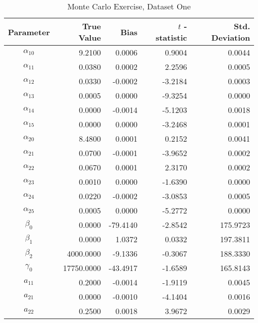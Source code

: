 \begin{table}\onehalfspacing
\begin{center}
\begin{threeparttable}
  \caption{Monte Carlo Exercise, Dataset One}
  \label{Monte Carlo: One}
  \begin{tabular}{crrrr}\toprule

  Parameter & True Value & Bias & $t$ - statistic & Std. Deviation \\
  \midrule
  $\alpha_{10}$ &     \phantom{20000}9.2100 &    \phantom{-17}0.0006 &     0.9004 &       0.0044 \\
  $\alpha_{11}$ &     0.0380 &    0.0002 &     2.2596 &       0.0005 \\
  $\alpha_{12}$ &     0.0330 &   -0.0002 &    -3.2184 &       0.0003 \\
  $\alpha_{13}$ &     0.0005 &    0.0000 &    -9.3254 &       0.0000 \\
  $\alpha_{14}$ &     0.0000 &   -0.0014 &    -5.1203 &       0.0018 \\
  $\alpha_{15}$ &     0.0000 &    0.0000 &    -3.2468 &       0.0001 \\
  $\alpha_{20}$ &     8.4800 &    0.0001 &     0.2152 &       0.0041 \\
  $\alpha_{21}$ &     0.0700 &   -0.0001 &    -3.9652 &       0.0002 \\
  $\alpha_{22}$ &     0.0670 &    0.0001 &     2.3170 &       0.0002 \\
  $\alpha_{23}$ &     0.0010 &    0.0000 &    -1.6390 &       0.0000 \\
  $\alpha_{24}$ &     0.0220 &   -0.0002 &    -3.0853 &       0.0005 \\
  $\alpha_{25}$ &     0.0005 &    0.0000 &    -5.2772 &       0.0000 \\
  $\beta_{0}$   &     0.0000 &  -79.4140 &    -2.8542 &     175.9723 \\
  $\beta_{1}$   &     0.0000 &    1.0372 &     0.0332 &     197.3811 \\
  $\beta_{2}$   &  4000.0000 &   -9.1336 &    -0.3067 &     188.3330 \\
  $\gamma_{0}$  & 17750.0000 &  -43.4917 &    -1.6589 &     165.8143 \\
  $a_{11}$      &     0.2000 &   -0.0014 &    -1.9119 &       0.0045 \\
  $a_{21}$      &     0.0000 &   -0.0010 &    -4.1404 &       0.0016 \\
  $a_{22}$      &     0.2500 &    0.0018 &     3.9672 &       0.0029 \\

\end{tabular}
\end{threeparttable}
\end{center}
\end{table}
